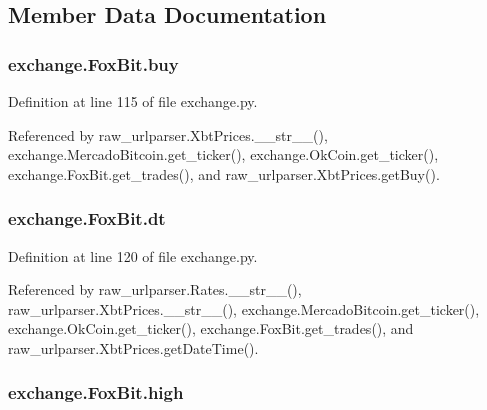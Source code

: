 \subsection{Member Data Documentation}
\hypertarget{classexchange_1_1_fox_bit_acb7e709cc05e8314b1bdacd32e4dfc80}{
\subsubsection[{buy}]{\setlength{\rightskip}{0pt plus 5cm}exchange.\-Fox\-Bit.\-buy}}\label{classexchange_1_1_fox_bit_acb7e709cc05e8314b1bdacd32e4dfc80}


Definition at line 115 of file exchange.\-py.



Referenced by raw\-\_\-urlparser.\-Xbt\-Prices.\-\_\-\-\_\-str\-\_\-\-\_\-(), exchange.\-Mercado\-Bitcoin.\-get\-\_\-ticker(), exchange.\-Ok\-Coin.\-get\-\_\-ticker(), exchange.\-Fox\-Bit.\-get\-\_\-trades(), and raw\-\_\-urlparser.\-Xbt\-Prices.\-get\-Buy().

\hypertarget{classexchange_1_1_fox_bit_a363f8488eb0423f88519c085ae6f168f}{
\subsubsection[{dt}]{\setlength{\rightskip}{0pt plus 5cm}exchange.\-Fox\-Bit.\-dt}}\label{classexchange_1_1_fox_bit_a363f8488eb0423f88519c085ae6f168f}


Definition at line 120 of file exchange.\-py.



Referenced by raw\-\_\-urlparser.\-Rates.\-\_\-\-\_\-str\-\_\-\-\_\-(), raw\-\_\-urlparser.\-Xbt\-Prices.\-\_\-\-\_\-str\-\_\-\-\_\-(), exchange.\-Mercado\-Bitcoin.\-get\-\_\-ticker(), exchange.\-Ok\-Coin.\-get\-\_\-ticker(), exchange.\-Fox\-Bit.\-get\-\_\-trades(), and raw\-\_\-urlparser.\-Xbt\-Prices.\-get\-Date\-Time().

\hypertarget{classexchange_1_1_fox_bit_a4f6dfaecbcc17ceadddf52d266d9c00d}{
\subsubsection[{high}]{\setlength{\rightskip}{0pt plus 5cm}exchange.\-Fox\-Bit.\-high}}\label{classexchange_1_1_fox_bit_a4f6dfaecbcc17ceadddf52d266d9c00d}


